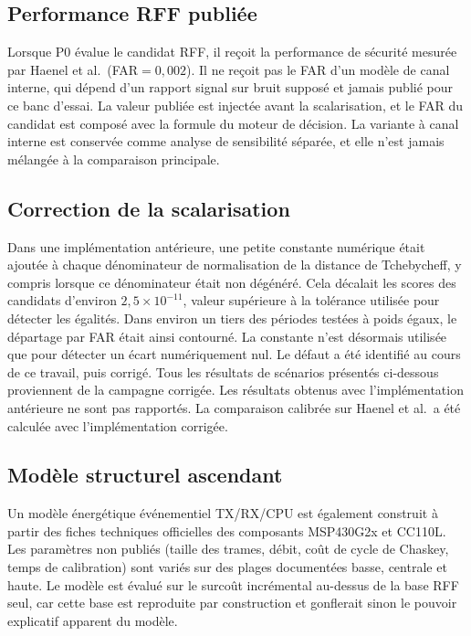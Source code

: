 \documentclass[conference]{IEEEtran}
\begin{document}
\subsection{Performance RFF publiée}

Lorsque P0 évalue le candidat RFF, il reçoit la performance de sécurité mesurée par Haenel et al.\ (FAR$=0{,}002$). Il ne reçoit pas le FAR d'un modèle de canal interne, qui dépend d'un rapport signal sur bruit supposé et jamais publié pour ce banc d'essai. La valeur publiée est injectée avant la scalarisation, et le FAR du candidat est composé avec la formule du moteur de décision. La variante à canal interne est conservée comme analyse de sensibilité séparée, et elle n'est jamais mélangée à la comparaison principale.

\subsection{Correction de la scalarisation}

Dans une implémentation antérieure, une petite constante numérique était ajoutée à chaque dénominateur de normalisation de la distance de Tchebycheff, y compris lorsque ce dénominateur était non dégénéré. Cela décalait les scores des candidats d'environ $2{,}5\times10^{-11}$, valeur supérieure à la tolérance utilisée pour détecter les égalités. Dans environ un tiers des périodes testées à poids égaux, le départage par FAR était ainsi contourné. La constante n'est désormais utilisée que pour détecter un écart numériquement nul. Le défaut a été identifié au cours de ce travail, puis corrigé. Tous les résultats de scénarios présentés ci-dessous proviennent de la campagne corrigée. Les résultats obtenus avec l'implémentation antérieure ne sont pas rapportés. La comparaison calibrée sur Haenel et al.\ a été calculée avec l'implémentation corrigée.

\subsection{Modèle structurel ascendant}

Un modèle énergétique événementiel TX/RX/CPU est également construit à partir des fiches techniques officielles des composants MSP430G2x et CC110L. Les paramètres non publiés (taille des trames, débit, coût de cycle de Chaskey, temps de calibration) sont variés sur des plages documentées basse, centrale et haute. Le modèle est évalué sur le surcoût incrémental au-dessus de la base RFF seul, car cette base est reproduite par construction et gonflerait sinon le pouvoir explicatif apparent du modèle.
\end{document}
